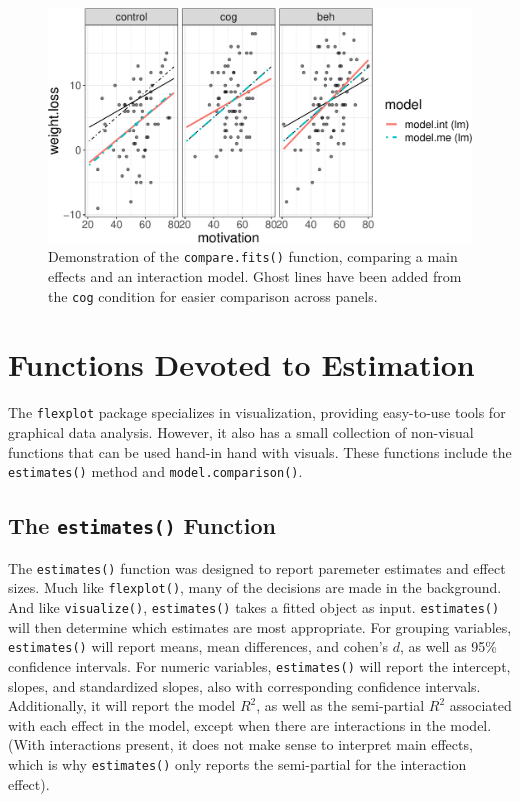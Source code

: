 \documentclass[
  doc]{apa6}
\begin{document}
\begin{figure}
\centering
\includegraphics{flexplot_psychmeth_files/figure-latex/compare-1.pdf}
\caption{\label{fig:compare}Demonstration of the \texttt{compare.fits()} function, comparing a main effects and an interaction model. Ghost lines have been added from the \texttt{cog} condition for easier comparison across panels. \label{fig:compare}}
\end{figure}

\hypertarget{functions-devoted-to-estimation}{%
\section{Functions Devoted to Estimation}\label{functions-devoted-to-estimation}}

The \texttt{flexplot} package specializes in visualization, providing easy-to-use tools for graphical data analysis. However, it also has a small collection of non-visual functions that can be used hand-in hand with visuals. These functions include the \texttt{estimates()} method and \texttt{model.comparison()}.

\hypertarget{the-estimates-function}{%
\subsection{\texorpdfstring{The \texttt{estimates()} Function}{The estimates() Function}}\label{the-estimates-function}}

The \texttt{estimates()} function was designed to report paremeter estimates and effect sizes. Much like \texttt{flexplot()}, many of the decisions are made in the background. And like \texttt{visualize()}, \texttt{estimates()} takes a fitted object as input. \texttt{estimates()} will then determine which estimates are most appropriate. For grouping variables, \texttt{estimates()} will report means, mean differences, and cohen's \(d\), as well as 95\% confidence intervals. For numeric variables, \texttt{estimates()} will report the intercept, slopes, and standardized slopes, also with corresponding confidence intervals. Additionally, it will report the model \(R^2\), as well as the semi-partial \(R^2\) associated with each effect in the model, except when there are interactions in the model. (With interactions present, it does not make sense to interpret main effects, which is why \texttt{estimates()} only reports the semi-partial for the interaction effect).
\end{document}
